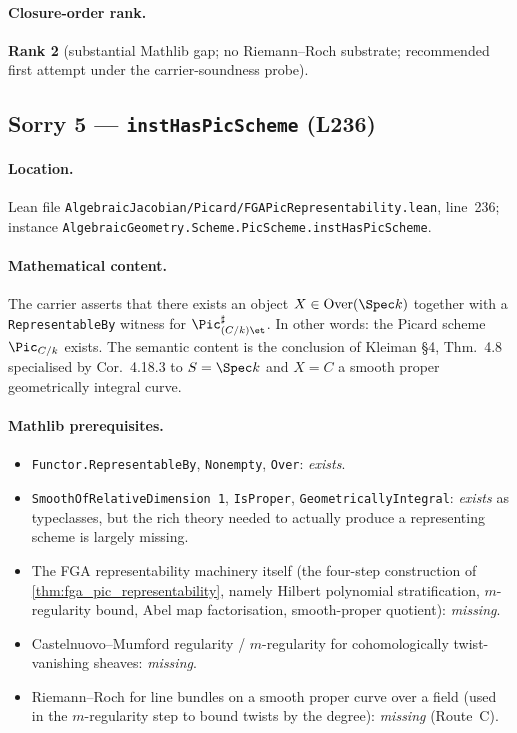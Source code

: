 \paragraph{Closure-order rank.} \textbf{Rank 2} (substantial Mathlib
gap; no Riemann--Roch substrate; recommended first attempt under the
carrier-soundness probe).

\subsection{Sorry 5 --- \texttt{instHasPicScheme} (L236)}
\label{subsec:sorry_has_pic_scheme}

\paragraph{Location.} Lean file
\texttt{AlgebraicJacobian/Picard/FGAPicRepresentability.lean},
line~236; instance
\texttt{AlgebraicGeometry.Scheme.PicScheme.instHasPicScheme}.

\paragraph{Mathematical content.} The carrier asserts that there
exists an object $X \in \mathrm{Over}(\Spec k)$ together with a
\texttt{RepresentableBy} witness for $\Pic^\sharp_{(C/k)\et}$. In
other words: the Picard scheme $\Pic_{C/k}$ exists. The semantic
content is the conclusion of Kleiman \S4, Thm.~4.8
specialised by Cor.~4.18.3 to $S = \Spec k$ and $X = C$
a smooth proper geometrically integral curve.

\paragraph{Mathlib prerequisites.}
\begin{itemize}
  \item \texttt{Functor.RepresentableBy}, \texttt{Nonempty},
    \texttt{Over}: \emph{exists}.
  \item \texttt{SmoothOfRelativeDimension 1},
    \texttt{IsProper}, \texttt{GeometricallyIntegral}: \emph{exists}
    as typeclasses, but the rich theory needed to actually produce a
    representing scheme is largely missing.
  \item The FGA representability machinery itself (the four-step
    construction of \cref{thm:fga_pic_representability}, namely
    Hilbert polynomial stratification, $m$-regularity bound, Abel
    map factorisation, smooth-proper quotient): \emph{missing}.
  \item Castelnuovo--Mumford regularity / $m$-regularity for
    cohomologically twist-vanishing sheaves: \emph{missing}.
  \item Riemann--Roch for line bundles on a smooth proper curve over
    a field (used in the $m$-regularity step to bound twists by the
    degree): \emph{missing} (Route~C).
\end{itemize}


